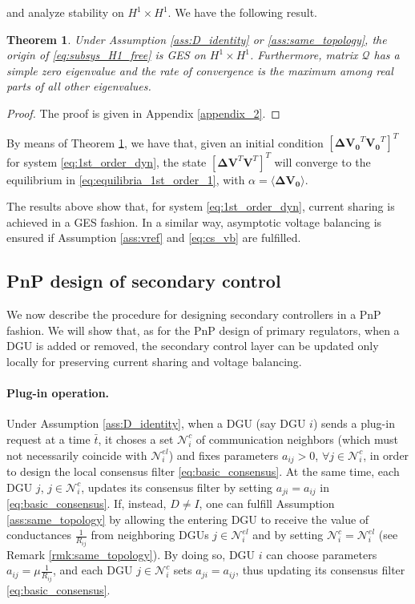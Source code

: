 \documentclass[a4paper]{article}
\theoremstyle{plain}
\newtheorem{theorem}{Theorem}
\begin{document}
and analyze stability on $H^1\times H^1$. We have the following result.
\begin{theorem}
	\label{thm:stability_1st_order}
	Under Assumption \ref{ass:D_identity} or \ref{ass:same_topology}, the origin of \eqref{eq:subsys_H1_free} is GES on $H^1\times H^1$. Furthermore, matrix $\mathcal{Q}$ has a simple zero eigenvalue and the rate of convergence is the maximum among real parts of all other eigenvalues.
\end{theorem}
\begin{proof}
	The proof is given in Appendix \ref{appendix_2}.
\end{proof}
By means of Theorem \ref{thm:stability_1st_order}, we have that, given
an initial condition $[\mathbf{\Delta V_0}^T \mathbf{V_0}^T]^T$ for system
\eqref{eq:1st_order_dyn}, the state $[\mathbf{\Delta V}^T \mathbf{V}^T]^T$
will converge to the equilibrium in \eqref{eq:equilibria_1st_order_1},
with $\alpha = \mathbf{\langle\Delta V_0\rangle}$.

The results above show that, for system \eqref{eq:1st_order_dyn}, current sharing is achieved in a GES fashion. In a similar way,  asymptotic voltage
balancing is ensured if Assumption
\ref{ass:vref} and \eqref{eq:cs_vb} are fulfilled.

\subsection{PnP design of secondary control}
\label{sec:pnp_sec_ctrl}
We now describe the procedure for designing secondary controllers in a PnP fashion. We will show that, as for the PnP design of primary regulators, when a DGU is added or removed, the secondary control layer can be updated only locally for preserving current sharing and voltage balancing.

\paragraph{Plug-in operation.} Under Assumption \ref{ass:D_identity}, when a DGU (say DGU $i$) sends a plug-in request at a time $\bar t$, it choses a
set $\mathcal{N}_{i}^c$ of communication neighbors (which must not necessarily coincide with $\mathcal{N}_{i}^{el}$) and fixes parameters $a_{ij}>0$, $\forall
j\in \mathcal{N}_{i}^c$, in order to design the local consensus filter
\eqref{eq:basic_consensus}. At the same time, each DGU $j$, $j\in\mathcal{N}_i^c$, updates its consensus filter by setting $a_{ji} = a_{ij}$ in \eqref{eq:basic_consensus}. If, instead, $D\neq I$, one can fulfill Assumption \ref{ass:same_topology} by allowing the entering DGU to receive the value of conductances $\frac{1}{R_{ij}}$ from neighboring DGUs $j\in \mathcal{N}_i^{el}$ and by setting $\mathcal{N}_i^{c} =\mathcal{N}_i^{el}$  (see Remark \ref{rmk:same_topology}). By doing so, DGU $i$ can choose parameters $a_{ij} = \mu\frac{1}{R_{ij}}$, and each DGU $j\in\mathcal{N}_i^{c}$ sets $a_{ji} =a_{ij}$, thus updating its consensus filter \eqref{eq:basic_consensus}.
\end{document}
